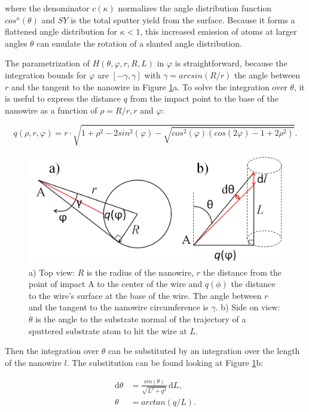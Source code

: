 where the denominator $c(\kappa)$ normalizes the angle distribution function $cos^\kappa(\theta)$ and $SY$ is the total sputter yield from the surface. Because it forms a flattened angle distribution for $\kappa < 1$, this increased emission of atoms at larger angles $\theta$ can emulate the rotation of a slanted angle distribution.

The parametrization of $H(\theta,\varphi,r,R,L)$ in $\varphi$ is straightforward, because the integration bounds for $\varphi$ are $[-\gamma, \gamma]$ with $\gamma = arcsin(R/r)$ the angle between $r$ and the tangent to the nanowire in Figure \ref{anglesredepo}a. To solve the integration over $\theta$, it is useful to express the distance $q$ from the impact point to the base of the nanowire as a function of $\rho = R/r, r$ and $\varphi$:

\begin{equation}
q(\rho,r,\varphi) = r\cdot \sqrt{1 + \rho^2 - 2sin^2(\varphi) - \sqrt{cos^2(\varphi)(cos(2\varphi) - 1 + 2\rho^2)}}.
\end{equation}

\begin{figure}
	\centering
		\includegraphics[width=.65\textwidth]{images/anglesredeposition.jpg}
	\caption{a) Top view: $R$ is the radius of the nanowire, $r$ the distance from the point of impact A to the center of the wire and $q(\phi)$ the distance to the wire's surface at the base of the wire. The angle between $r$ and the tangent to the nanowire circumference is $\gamma$. b) Side on view: $\theta$ is the angle to the substrate normal of the trajectory of a sputtered substrate atom to hit the wire at $L$.} 
	\label{anglesredepo}
\end{figure} 

Then the integration over $\theta$ can be substituted by an integration over the length of the nanowire $l$. The substitution can be found looking at Figure \ref{anglesredepo}b:

\begin{align*}
\mathrm{d}\theta &= \frac{sin(\theta)}{\sqrt{L^2 + q^2}}\,\mathrm{d}L,\\
\theta &= arctan(q/L).
\end{align*}


